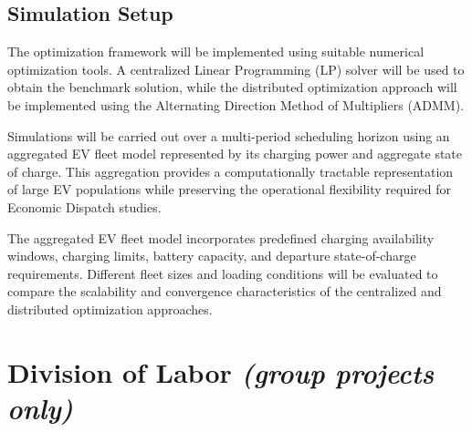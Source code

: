 \documentclass[12pt, a4paper]{article}
\begin{document}
\subsection{Simulation Setup}

The optimization framework will be implemented using suitable numerical optimization tools. A centralized Linear Programming (LP) solver will be used to obtain the benchmark solution, while the distributed optimization approach will be implemented using the Alternating Direction Method of Multipliers (ADMM).

Simulations will be carried out over a multi-period scheduling horizon using an aggregated EV fleet model represented by its charging power and aggregate state of charge. This aggregation provides a computationally tractable representation of large EV populations while preserving the operational flexibility required for Economic Dispatch studies.

The aggregated EV fleet model incorporates predefined charging availability windows, charging limits, battery capacity, and departure state-of-charge requirements. Different fleet sizes and loading conditions will be evaluated to compare the scalability and convergence characteristics of the centralized and distributed optimization approaches.

%
\appendix
%
\section{\texorpdfstring{Division of Labor \normalfont\small\itshape(group projects only)}{Division of Labor (group projects only)}}
\end{document}
